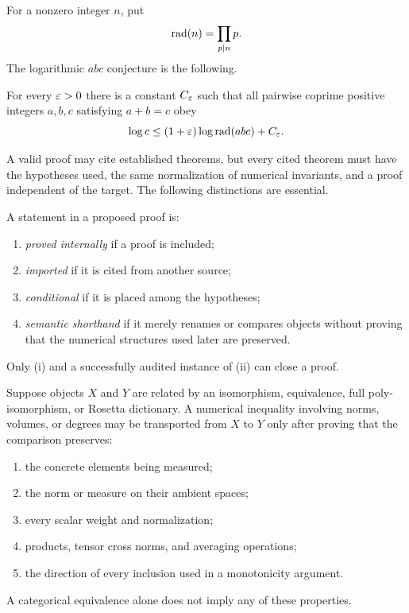 
For a nonzero integer $n$, put
\[
 \operatorname{rad}(n)=\prod_{p\mid n}p.
\]
The logarithmic $abc$ conjecture is the following.

\begin{theorem}\label{thm:abc}
For every $\varepsilon>0$ there is a constant $C_\varepsilon$ such that all pairwise coprime positive integers $a,b,c$ satisfying $a+b=c$ obey
\[
 \log c\le (1+\varepsilon)\log\operatorname{rad}(abc)+C_\varepsilon.
\]
\end{theorem}

A valid proof may cite established theorems, but every cited theorem must have the hypotheses used, the same normalization of numerical invariants, and a proof independent of the target.  The following distinctions are essential.

\begin{definition}
A statement in a proposed proof is:
\begin{enumerate}[label=(\roman*)]
\item \emph{proved internally} if a proof is included;
\item \emph{imported} if it is cited from another source;
\item \emph{conditional} if it is placed among the hypotheses;
\item \emph{semantic shorthand} if it merely renames or compares objects without proving that the numerical structures used later are preserved.
\end{enumerate}
Only (i) and a successfully audited instance of (ii) can close a proof.
\end{definition}

\begin{criterion}\label{crit:numerical-transport}
Suppose objects $X$ and $Y$ are related by an isomorphism, equivalence, full poly-isomorphism, or Rosetta dictionary.  A numerical inequality involving norms, volumes, or degrees may be transported from $X$ to $Y$ only after proving that the comparison preserves:
\begin{enumerate}[label=(\alph*)]
\item the concrete elements being measured;
\item the norm or measure on their ambient spaces;
\item every scalar weight and normalization;
\item products, tensor cross norms, and averaging operations;
\item the direction of every inclusion used in a monotonicity argument.
\end{enumerate}
A categorical equivalence alone does not imply any of these properties.
\end{criterion}

